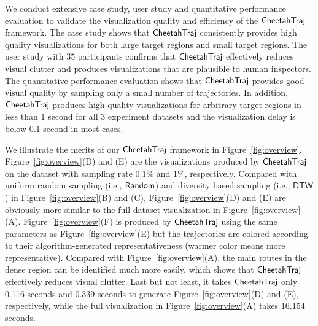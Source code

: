 
%


We conduct extensive case study, user study and quantitative performance evaluation to validate the visualization quality and efficiency of the $\mathsf{CheetahTraj}$ framework. The case study shows that $\mathsf{CheetahTraj}$ consistently provides high quality visualizations for both large target regions and small target regions. The user study with 35 participants confirms that $\mathsf{CheetahTraj}$ effectively reduces visual clutter and produces visualizations that are plausible to human inspectors. The quantitative performance evaluation shows that $\mathsf{CheetahTraj}$ provides good visual quality by sampling only a small number of trajectories. In addition,  $\mathsf{CheetahTraj}$ produces high quality visualizations for arbitrary target regions in less than 1 second for all 3 experiment datasets and the visualization delay is below 0.1 second in most cases.


We illustrate the merits of our $\mathsf{CheetahTraj}$ framework in Figure~\ref{fig:overview}. Figure~\ref{fig:overview}(D) and (E) are the visualizations produced by $\mathsf{CheetahTraj}{}$ on the \pt{} dataset with sampling rate $0.1\%$ and $1\%$, respectively. Compared with uniform random sampling (i.e., $\mathsf{Random}$) and diversity based sampling (i.e., $\mathsf{DTW}$) in Figure~\ref{fig:overview}(B) and (C), Figure~\ref{fig:overview}(D) and (E) are obviously more similar to the full dataset visualization in Figure~\ref{fig:overview}(A).
Figure~\ref{fig:overview}(F) is produced by $\mathsf{CheetahTraj}{}$ using the same parameters as Figure~\ref{fig:overview}(E) but the trajectories are colored according to their algorithm-generated representativeness (warmer color means more representative). Compared with Figure~\ref{fig:overview}(A), the main routes in the dense region can be identified much more easily, which shows that $\mathsf{CheetahTraj}{}$ effectively reduces visual clutter. Last but not least, it takes $\mathsf{CheetahTraj}{}$ only 0.116 seconds and 0.339 seconds to generate Figure~\ref{fig:overview}(D) and (E), respectively, while the full visualization in Figure~\ref{fig:overview}(A) takes 16.154 seconds.



